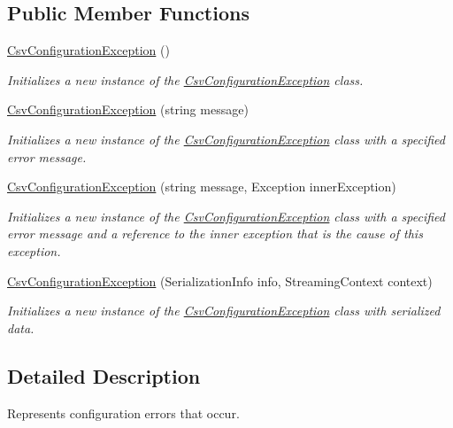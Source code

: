 \subsection*{Public Member Functions}
\begin{DoxyCompactItemize}
\item 
\hyperlink{a00044_a26b35b967f6c7e409dd84bdb60619993}{Csv\-Configuration\-Exception} ()
\begin{DoxyCompactList}\small\item\em Initializes a new instance of the \hyperlink{a00044}{Csv\-Configuration\-Exception} class. \end{DoxyCompactList}\item 
\hyperlink{a00044_a77c920cd1ce043a9494cd19cb074f84e}{Csv\-Configuration\-Exception} (string message)
\begin{DoxyCompactList}\small\item\em Initializes a new instance of the \hyperlink{a00044}{Csv\-Configuration\-Exception} class with a specified error message. \end{DoxyCompactList}\item 
\hyperlink{a00044_a2dee1f8508b1411b8dc4d369abfd04aa}{Csv\-Configuration\-Exception} (string message, Exception inner\-Exception)
\begin{DoxyCompactList}\small\item\em Initializes a new instance of the \hyperlink{a00044}{Csv\-Configuration\-Exception} class with a specified error message and a reference to the inner exception that is the cause of this exception. \end{DoxyCompactList}\item 
\hyperlink{a00044_af53550f7b533e7878e010c4048e6686c}{Csv\-Configuration\-Exception} (Serialization\-Info info, Streaming\-Context context)
\begin{DoxyCompactList}\small\item\em Initializes a new instance of the \hyperlink{a00044}{Csv\-Configuration\-Exception} class with serialized data. \end{DoxyCompactList}\end{DoxyCompactItemize}


\subsection{Detailed Description}
Represents configuration errors that occur. 



